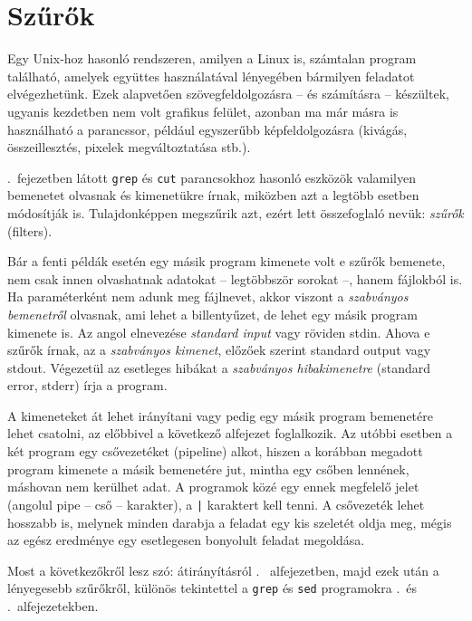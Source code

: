 \chapter{Szűrők}%
\label{cha:szűrők}

Egy Unix-hoz hasonló rendszeren, amilyen a Linux is, számtalan program
található, amelyek együttes használatával lényegében bármilyen feladatot
elvégezhetünk. Ezek alapvetően szövegfeldolgozásra -- és számításra --
készültek, ugyanis kezdetben nem volt grafikus felület, azonban ma már másra is
használható a parancssor, például egyszerűbb képfeldolgozásra (kivágás,
összeillesztés, pixelek megváltoztatása stb.).

.\ fejezetben látott \texttt{grep} és \texttt{cut}
parancsokhoz hasonló eszközök valamilyen bemenetet olvasnak és kimenetükre
írnak, miközben azt a legtöbb esetben módosítják is. Tulajdonképpen megszűrik
azt, ezért lett összefoglaló nevük: \emph{szűrők} (filters).

Bár a fenti példák esetén egy másik program kimenete volt e szűrők bemenete, nem
csak innen olvashatnak adatokat -- legtöbbször sorokat --, hanem fájlokból
is. Ha paraméterként nem adunk meg fájlnevet, akkor viszont a \emph{szabványos
  bemenetről} olvasnak, ami lehet a billentyűzet, de lehet egy másik program
kimenete is. Az angol elnevezése \emph{standard input} vagy röviden stdin. Ahova
e szűrők írnak, az a \emph{szabványos kimenet}, előzőek szerint standard output
vagy stdout. Végezetül az esetleges hibákat a \emph{szabványos hibakimenetre}
(standard error, stderr) írja a program.

A kimeneteket át lehet irányítani vagy pedig egy másik program
bemenetére lehet csatolni, az előbbivel a következő alfejezet foglalkozik. Az
utóbbi esetben a két program egy csővezetéket (pipeline) alkot, hiszen a
korábban megadott program kimenete a másik bemenetére jut, mintha egy csőben
lennének, máshovan nem kerülhet adat. A programok közé egy ennek megfelelő jelet
(angolul pipe -- cső -- karakter), a  \verb,|, karaktert kell tenni. A
csővezeték lehet hosszabb is, melynek minden darabja a feladat egy kis szeletét
oldja meg, mégis az egész eredménye egy esetlegesen bonyolult feladat megoldása.

Most a következőkről lesz szó: átirányításról .\ %
alfejezetben, majd ezek után a lényegesebb szűrőkről, különös tekintettel a
\texttt{grep} és \texttt{sed} programokra .\ és
.\ alfejezetekben.


